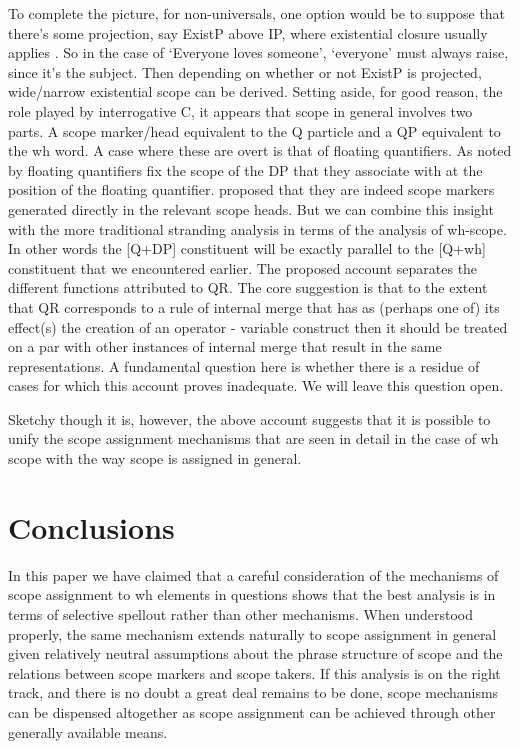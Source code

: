 \documentclass[charis]{glossa}
\begin{document}
To complete the picture, for non-universals, one option would be to  suppose that there's some projection, say ExistP above IP, where existential closure usually applies \citep{kratzer:2005}. So in the case of  `Everyone loves someone', `everyone' must always raise, since it's the subject. Then depending on whether or not ExistP is projected,  wide/narrow existential scope can be derived.  Setting aside, for good reason, the role played by interrogative C, it appears that scope in general involves two parts.  A scope marker/head equivalent to the Q particle and a QP equivalent to the wh word.  A case where these are overt is that of floating quantifiers.  As noted by \citet{dowty-brodie:1984} floating quantifiers fix the scope of the DP that they associate with at the position of the floating quantifier.  \citet{tsoulas:2003} proposed that they are indeed scope markers generated directly in the relevant scope heads.  But we can combine this insight with the more traditional stranding analysis in terms of the analysis of wh-scope.  In other words the [Q+DP] constituent will be exactly parallel to the [Q+wh] constituent that we encountered earlier.
The proposed account separates the different functions attributed to QR. The core suggestion is that to the extent that QR corresponds to a rule of internal merge that has as (perhaps one of) its effect(s) the creation of an operator - variable construct then it should be treated on a par with other instances of internal merge that result in the same representations.  A fundamental question here is whether there is a residue of cases for which this account proves inadequate. We will leave this question open. 

Sketchy though it is, however, the above account suggests that it is possible to unify the scope assignment mechanisms that are seen in detail in the case of wh scope with the way scope is assigned in general.  

\section{Conclusions}
In this paper we have claimed that a careful consideration of the mechanisms of scope assignment to wh elements in questions shows that the best analysis is in terms of selective spellout rather than other mechanisms.  When understood properly, the same mechanism extends naturally to scope assignment in general given relatively neutral assumptions about the phrase structure of scope and the relations between scope markers and scope takers.  If this analysis is on the right track, and there is no doubt a great deal remains to be done, scope mechanisms can be dispensed altogether as scope assignment can be achieved through other generally available means.
\end{document}
